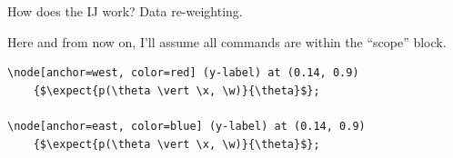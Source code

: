 \documentclass[8pt]{beamer}\usepackage[]{graphicx}\usepackage[]{color}
\def\expect#1#2{\underset{#1}{\mathbb{E}}\left[#2\right]}
\def\x{x}
\def\w{w}
\begin{document}
\begin{frame}[fragile]{How does the IJ work?  Data re-weighting.}

\begin{center}
\begin{minipage}{0.38\textwidth}
\end{minipage}
\end{center}

\hrulefill

Here and from now on, I'll assume all commands are within the ``scope'' block.

\begin{lstlisting}
\node[anchor=west, color=red] (y-label) at (0.14, 0.9)
    {$\expect{p(\theta \vert \x, \w)}{\theta}$};

\node[anchor=east, color=blue] (y-label) at (0.14, 0.9)
    {$\expect{p(\theta \vert \x, \w)}{\theta}$};
\end{lstlisting}

\end{frame}
\end{document}
